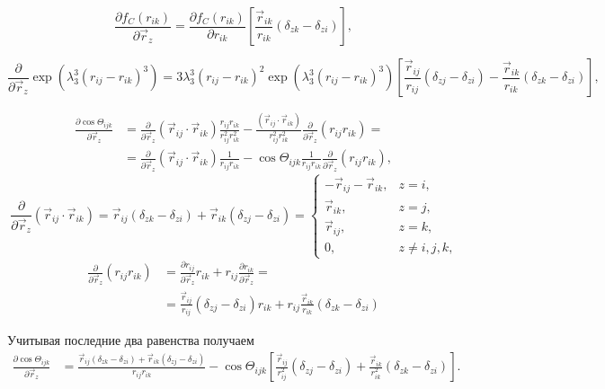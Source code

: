 \begin{equation}
\frac{\partial f_C(r_{ik})}{\partial \vec{r}_z} =  \frac{\partial f_C(r_{ik})}{\partial r_{ik}} \left[ \frac{\vec {r}_{ik}}{r_{ik}}\left(\delta_{zk} - \delta_{zi}\right)\right],
\end{equation}

\begin{equation*}
\frac{\partial}{\partial \vec{r}_z} \exp(\lambda^3_3(r_{ij} - r_{ik})^3) = 3 \lambda^3_3 (r_{ij} - r_{ik})^2 \exp(\lambda^3_3(r_{ij} - r_{ik})^3) 
\left[ \frac{\vec {r}_{ij}}{r_{ij}}(\delta_{zj} - \delta_{zi}) - \frac{\vec {r}_{ik}}{r_{ik}}\left(\delta_{zk} - \delta_{zi}\right)\right],
\end{equation*}

\begin{align*}
\frac{\partial \cos\Theta_{ijk}}{\partial \vec{r}_z}  & =  \frac{\partial}{\partial \vec{r}_z}\left( \vec{r}_{ij}\cdot\vec{r}_{ik}\right) \frac{r_{ij} r_{ik}}{r^2_{ij} r^2_{ik}} -  \frac{(\vec{r}_{ij}\cdot\vec{r}_{ik}) }{r^2_{ij} r^2_{ik}}\frac{\partial}{\partial \vec{r}_z} (r_{ij} r_{ik}) = \\
  & = \frac{\partial}{\partial \vec{r}_z}\left( \vec{r}_{ij}\cdot\vec{r}_{ik}\right) \frac{1}{r_{ij} r_{ik}} -  \cos\Theta_{ijk} \frac{1}{r_{ij} r_{ik}}  \frac{\partial}{\partial \vec{r}_z} (r_{ij} r_{ik}), 
\end{align*}
\[
\frac{\partial}{\partial \vec{r}_z}(\vec{r}_{ij}\cdot\vec{r}_{ik}) = \vec{r}_{ij}(\delta_{zk} - \delta_{zi}) + \vec{r}_{ik}(\delta_{zj} - \delta_{zi}) = 
\begin{cases}
-\vec{r}_{ij} -  \vec{r}_{ik}, &\text{$z = i$,}\\
\vec{r}_{ik}, &\text{$z = j$,}\\
\vec{r}_{ij}, &\text{$z = k$,}\\
0, &\text{$z \neq i, j, k$,}
\end{cases}
\]
\begin{align*}
\frac{\partial}{\partial \vec{r}_z}(r_{ij}r_{ik})  & = \frac{\partial r_{ij}}{\partial \vec{r}_z}r_{ik} +  r_{ij} \frac{\partial r_{ik}}{\partial \vec{r}_z} = \\
& = \frac{\vec {r}_{ij}}{r_{ij}}(\delta_{zj} - \delta_{zi})r_{ik} + r_{ij}\frac{\vec {r}_{ik}}{r_{ik}}\left(\delta_{zk} - \delta_{zi}\right)
\end{align*}

Учитывая последние два равенства получаем
\begin{align*}
\frac{\partial \cos\Theta_{ijk}}{\partial \vec{r}_z}  & =  \frac{\vec{r}_{ij}(\delta_{zk} - \delta_{zi}) + \vec{r}_{ik}(\delta_{zj} - \delta_{zi})}{r_{ij}r_{ik}} -
\cos\Theta_{ijk} \left[ \frac{\vec {r}_{ij}}{r^2_{ij}}(\delta_{zj} - \delta_{zi}) + \frac{\vec {r}_{ik}}{r^2_{ik}}\left(\delta_{zk} - \delta_{zi}\right) \right]. 
\end{align*}

